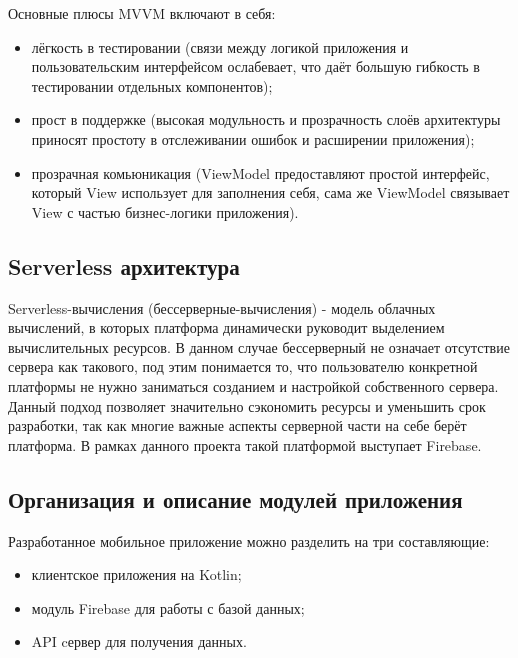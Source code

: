  Основные плюсы MVVM включают в себя:

\begin{itemize}
  \item лёгкость в тестировании (связи между логикой приложения и пользовательским интерфейсом ослабевает, что даёт большую гибкость в тестировании отдельных компонентов);
  \item прост в поддержке (высокая модульность и прозрачность слоёв архитектуры приносят простоту в отслеживании ошибок и расширении приложения);
  \item прозрачная комьюникация (ViewModel предоставляют простой интерфейс, который View использует для заполнения себя, сама же ViewModel связывает View с частью бизнес-логики приложения).
\end{itemize}
 
\subsection{Serverless архитектура}
Serverless-вычисления (бессерверные-вычисления) - модель облачных вычислений, в которых платформа динамически руководит выделением вычислительных ресурсов. 
В данном случае бессерверный не означает отсутствие сервера как такового, под этим понимается то, что пользователю конкретной платформы не нужно заниматься созданием и настройкой собственного сервера. 
Данный подход позволяет значительно сэкономить ресурсы и уменьшить срок разработки, так как многие важные аспекты серверной части на себе берёт платформа. 
В рамках данного проекта такой платформой выступает Firebase.
 
\subsection{Организация и описание модулей приложения}
Разработанное мобильное приложение можно разделить на три составляющие:
\begin{itemize}
 \item клиентское приложения на Kotlin;
 \item модуль Firebase для работы с базой данных;
 \item API cервер для получения данных.
\end{itemize}
 
